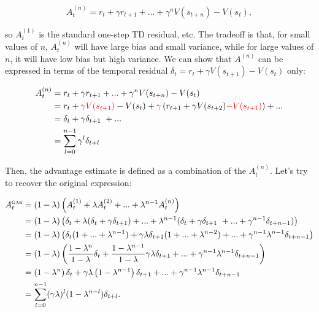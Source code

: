\begin{equation}
	A^{(n)}_t = r_t + \gamma r_{t+1} + ... + \gamma^n V(s_{t+n}) - V(s_t),
\end{equation}

so $A^{(1)}_t$ is the standard one-step TD residual, etc. The tradeoff is that, for small values of $n$, $A^{(n)}_t$ will have large bias and small variance, while for large values of $n$, it will have low bias but high variance. We can show that $A^{(n)}$ can be expressed in terms of the temporal residual $\delta_t = r_t + \gamma V(s_{t+1}) - V(s_t)$ only:

\begin{equation}
\begin{aligned}
	A^{(n)}_t 	&= r_t + \gamma r_{t+1} + ... + \gamma^n V(s_{t+n}) - V(s_t)\\
			&= r_t + \textcolor{red}{\gamma V(s_{t+1})} - V(s_t) + \textcolor{red}{\gamma} \left( r_{t+1} + \gamma V(s_{t+2}) \textcolor{red}{- V(s_{t+1})} \right) + ...\\
			&= \delta_{t} + \gamma \delta_{t+1} + ...\\
			&= \sum_{l=0}^{n-1} \gamma^l \delta_{t+l}
\end{aligned}
\end{equation}

Then, the \gae advantage estimate is defined as a combination of the $A^{(n)}_t$. Let's try to recover the original expression:

\begin{equation}
\label{eq:gae}
\begin{aligned}
	A^{\gae}_t 	&= (1-\lambda) \left( A^{(1)}_t + \lambda A^{(2)}_t + ... + \lambda^{n-1} A^{(n)}_t \right)\\
				&= (1-\lambda) \left( \delta_t + \lambda(\delta_t + \gamma \delta_{t+1}) + ... + \lambda^{n-1} (\delta_t + \gamma \delta_{t+1} + ... + \gamma^{n-1} \delta_{t+n-1}) \right)\\
				&= (1-\lambda) \left( \delta_t (1 + ... + \lambda^{n-1}) + \gamma \lambda \delta_{t+1} (1 + ... + \lambda^{n-2}) + ... + \gamma^{n-1} \lambda^{n-1} \delta_{t+n-1} \right)\\
				&= (1-\lambda) \left( \frac{1 - \lambda^n}{1 - \lambda} \delta_t + \frac{1 - \lambda^{n-1}}{1 - \lambda} \gamma \lambda \delta_{t+1} + ... + \gamma^{n-1} \lambda^{n-1} \delta_{t+n-1} \right)\\
				&= \left(1-\lambda^{n} \right) \delta_t + \gamma \lambda \left(1-\lambda^{n-1} \right) \delta_{t+1} + ... + \gamma^{n-1} \lambda^{n-1} \delta_{t+n-1}\\
				&= \sum_{l=0}^{n-1} (\gamma \lambda)^l (1 - \lambda^{n-l}) \delta_{t+l}.
\end{aligned}
\end{equation}

